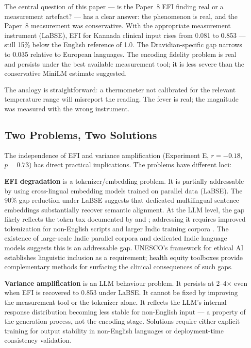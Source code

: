 \documentclass[11pt,a4paper]{article}
\begin{document}
The central question of this paper --- is the Paper~8 EFI finding real or a measurement
artefact? --- has a clear answer: the phenomenon is real, and the Paper~8 measurement was
conservative. With the appropriate measurement instrument (LaBSE), EFI for Kannada
clinical input rises from 0.081 to 0.853 --- still 15\% below the English reference of
1.0. The Dravidian-specific gap narrows to 0.035 relative to European languages. The
encoding fidelity problem is real and persists under the best available measurement tool;
it is less severe than the conservative MiniLM estimate suggested.

The analogy is straightforward: a thermometer not calibrated for the relevant temperature
range will misreport the reading. The fever is real; the magnitude was measured with the
wrong instrument.

\subsection{Two Problems, Two Solutions}

The independence of EFI and variance amplification (Experiment E, $r = -0.18$, $p =
0.73$) has direct practical implications. The problems have different loci:

\textbf{EFI degradation} is a tokenizer/embedding problem. It is partially addressable
by using cross-lingual embedding models trained on parallel data (LaBSE). The 90\%
gap reduction under LaBSE suggests that dedicated multilingual sentence embeddings
substantially recover semantic alignment. At the LLM level, the gap likely reflects the
token tax documented by \citet{petrov2023} and \citet{ahia2023}; addressing it requires
improved tokenization for non-English scripts \citep{rust2021} and larger Indic training
corpora \citep{khanuja2021,ramesh2022}. The existence of large-scale Indic parallel
corpora \citep{ramesh2022} and dedicated Indic language models \citep{doddapaneni2023}
suggests this is an addressable gap. UNESCO's framework for ethical AI \citep{unesco2023}
establishes linguistic inclusion as a requirement; health equity toolboxes
\citep{pfohl2024} provide complementary methods for surfacing the clinical consequences
of such gaps.

\textbf{Variance amplification} is an LLM behaviour problem. It persists at 2--4$\times$
even when EFI is recovered to 0.853 under LaBSE. It cannot be fixed by improving the
measurement tool or the tokenizer alone. It reflects the LLM's internal response
distribution becoming less stable for non-English input --- a property of the generation
process, not the encoding stage. Solutions require either explicit training for output
stability in non-English languages or deployment-time consistency validation.
\end{document}
